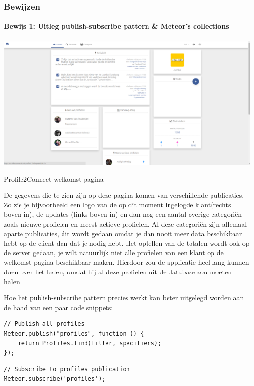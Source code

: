 \subsubsection{Bewijzen}
\paragraph{Bewijs 1: Uitleg publish-subscribe pattern \& Meteor's collections}
\begin{center}
\includegraphics[width=\textwidth,keepaspectratio]{attachments/profile2connect}
\caption{\label{fig:profile2connect-home} Profile2Connect welkomst pagina}
\end{center}

De gegevens die te zien zijn op deze pagina komen van verschillende publicaties. Zo zie je bijvoorbeeld een logo van de op dit moment ingelogde klant(rechts boven in), de updates (links boven in) en dan nog een aantal overige categoriën zoals nieuwe profielen en meest actieve profielen. Al deze categoriën zijn allemaal aparte publicaties, dit wordt gedaan omdat je dan nooit meer data beschikbaar hebt op de client dan dat je nodig hebt. Het optellen van de totalen wordt ook op de server gedaan, je wilt natuurlijk niet alle profielen van een klant op de welkomst pagina beschikbaar maken. Hierdoor zou de applicatie heel lang kunnen doen over het laden, omdat hij al deze profielen uit de database zou moeten halen.

Hoe het publish-subscribe pattern precies werkt kan beter uitgelegd worden aan de hand van een paar code snippets:
\begin{lstlisting}[caption=Profielen publiceren]
// Publish all profiles
Meteor.publish("profiles", function () {
    return Profiles.find(filter, specifiers);
});
\end{lstlisting}

\begin{lstlisting}[caption=Profielen abonneren]
// Subscribe to profiles publication
Meteor.subscribe('profiles');
\end{lstlisting}

